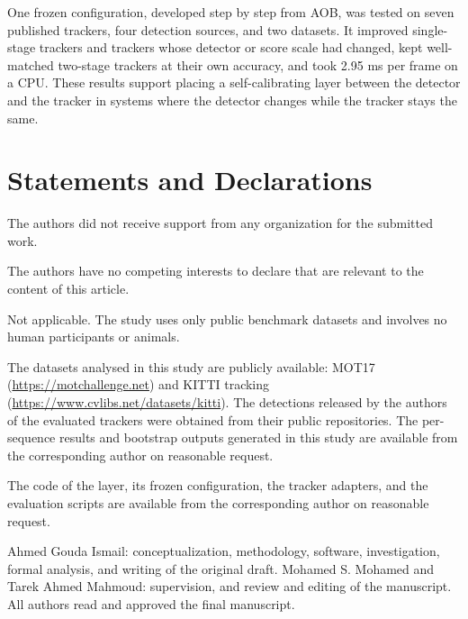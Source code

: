 \documentclass[pdflatex,sn-mathphys-num,iicol]{sn-jnl}
\newcommand{\aob}{AOB}
\begin{document}
One frozen configuration, developed step by step from \aob{}, was tested on
seven published trackers, four detection sources, and two datasets. It
improved single-stage trackers and trackers whose detector or score scale had
changed, kept well-matched two-stage trackers at their own accuracy, and took
2.95 ms per frame on a CPU. These results support placing a self-calibrating
layer between the detector and the tracker in systems where the detector
changes while the tracker stays the same.

\backmatter

\section*{Statements and Declarations}

The authors did not receive support from any organization for the submitted work.

The authors have no competing interests to declare that are relevant to the content of this
article.

Not applicable. The study uses only public benchmark datasets and involves no human participants
or animals.

The datasets analysed in this study are publicly available: MOT17
(\url{https://motchallenge.net}) and KITTI tracking (\url{https://www.cvlibs.net/datasets/kitti}).
The detections released by the authors of the evaluated trackers were obtained from their public
repositories. The per-sequence results and bootstrap outputs generated in this study are available
from the corresponding author on reasonable request.

The code of the layer, its frozen configuration, the tracker adapters, and the evaluation scripts
are available from the corresponding author on reasonable request.

Ahmed Gouda Ismail: conceptualization, methodology, software, investigation, formal analysis, and
writing of the original draft. Mohamed S. Mohamed and Tarek Ahmed Mahmoud: supervision, and
review and editing of the manuscript. All authors read and approved the final manuscript.

\end{document}
